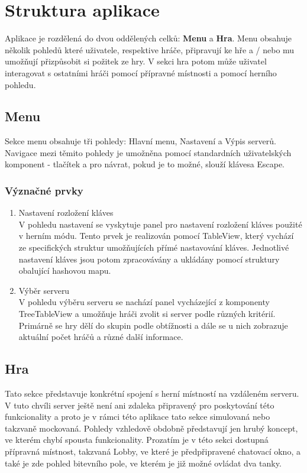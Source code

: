 \documentclass[12pt,a4paper]{article}
\let\oldsection\section
\renewcommand\section{\clearpage\oldsection}
\begin{document}
\section{Struktura aplikace}
Aplikace je rozdělená do dvou oddělených celků: \textbf{Menu} a \textbf{Hra}. Menu obsahuje několik pohledů které uživatele, respektive hráče, připravují ke hře a / nebo mu umožňují přizpůsobit si požitek ze hry. V sekci hra potom může uživatel interagovat s ostatními hráči pomocí přípravné místnosti a pomocí herního pohledu.

\subsection{Menu}
Sekce menu obsahuje tři pohledy: Hlavní menu, Nastavení a Výpis serverů. Navigace mezi těmito pohledy je umožněna pomocí standardních uživatelských komponent - tlačítek a pro návrat, pokud je to možné, slouží klávesa Escape.

\subsubsection{Význačné prvky}
\begin{enumerate}
\item Nastavení rozložení kláves \\
V pohledu nastavení se vyskytuje panel pro nastavení rozložení kláves použité v herním módu. Tento prvek je realizován pomocí TableView, který vychází ze specifických struktur umožňujících přímé nastavování kláves. Jednotlivé nastavení kláves jsou potom zpracovávány a ukládány pomocí struktury obalující hashovou mapu.
\item Výběr serveru \\
V pohledu výběru serveru se nachází panel vycházející z komponenty TreeTableView a umožňuje hráči zvolit si server podle různých kritérií. Primárně se hry dělí do skupin podle obtížnosti a dále se u nich zobrazuje aktuální počet hráčů a různé další informace.
\end{enumerate}

\subsection{Hra}
Tato sekce představuje konkrétní spojení s herní místností na vzdáleném serveru. V tuto chvíli server ještě není ani zdaleka připravený pro poskytování této funkcionality a proto je v rámci této aplikace tato sekce simulovaná nebo takzvaně mockovaná. Pohledy vzhledově obdobně představují jen hrubý koncept, ve kterém chybí spousta funkcionality. Prozatím je v této sekci dostupná přípravná místnost, takzvaná Lobby, ve které je předpřipravené chatovací okno, a také je zde pohled bitevního pole, ve kterém je již možné ovládat dva tanky.
\end{document}
